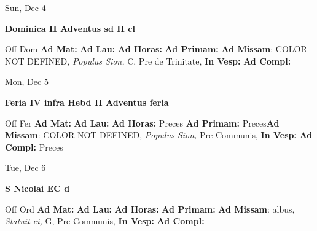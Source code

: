 \documentclass[10pt]{book}
\begin{document}
\begin{center}
\begin{minipage}{3.5in}
\vspace{2em}
\begin{center}Sun, Dec 4
\end{center}
\textbf{ \large Dominica II Adventus
\textnormal{\normalsize sd II cl}}

\begin{justify}Off Dom
\textbf{Ad Mat: }
\textbf{Ad Lau: }
\textbf{Ad Horas: }
\textbf{Ad Primam: }\textbf{Ad Missam}: COLOR NOT DEFINED, \textit{Populus Sion,} C, Pre de Trinitate, 
\textbf{In Vesp: }
\textbf{Ad Compl: }
\end{justify}
\end{minipage}
\end{center}

\begin{center}
\begin{minipage}{3.5in}
\vspace{2em}
\begin{center}Mon, Dec 5
\end{center}
\textbf{ \large Feria IV infra Hebd II Adventus
\textnormal{\normalsize feria}}

\begin{justify}Off Fer
\textbf{Ad Mat: }
\textbf{Ad Lau: }
\textbf{Ad Horas: }Preces
\textbf{Ad Primam: }Preces\textbf{Ad Missam}: COLOR NOT DEFINED, \textit{Populus Sion,} Pre Communis, 
\textbf{In Vesp: }
\textbf{Ad Compl: }Preces
\end{justify}
\end{minipage}
\end{center}

\begin{center}
\begin{minipage}{3.5in}
\vspace{2em}
\begin{center}Tue, Dec 6
\end{center}
\textbf{ \large S Nicolai EC
\textnormal{\normalsize d}}

\begin{justify}Off Ord
\textbf{Ad Mat: }
\textbf{Ad Lau: }
\textbf{Ad Horas: }
\textbf{Ad Primam: }\textbf{Ad Missam}: albus, \textit{Statuit ei,} G, Pre Communis, 
\textbf{In Vesp: }
\textbf{Ad Compl: }
\end{justify}
\end{minipage}
\end{center}
\end{document}
